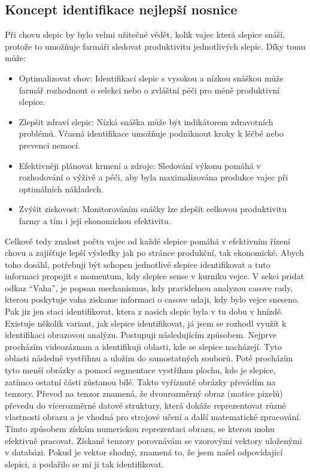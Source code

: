 
\subsection{Koncept identifikace nejlepší nosnice}\label{subsec:koncept-identifikace-nejlepsi-nosnice}

Při chovu slepic by bylo velmi užitečné vědět, kolik vajec která slepice snáší, protože to umožňuje farmáři sledovat produktivitu jednotlivých slepic.
Díky tomu může:
\begin{itemize}
    \item Optimalizovat chov: Identifikací slepic s vysokou a nízkou snáškou může farmář rozhodnout o selekci nebo o zvláštní péči pro méně produktivní slepice.
    \item Zlepšit zdraví slepic: Nízká snáška může být indikátorem zdravotních problémů. Včasná identifikace umožňuje podniknout kroky k léčbě nebo prevenci nemocí.
    \item Efektivněji plánovat krmení a zdroje: Sledování výkonu pomáhá v rozhodování o výživě a péči, aby byla maximalizována produkce vajec při optimálních nákladech.
    \item Zvýšit ziskovost: Monitorováním snášky lze zlepšit celkovou produktivitu farmy a tím i její ekonomickou efektivitu.
\end{itemize}

Celkově tedy znalost počtu vajec od každé slepice pomáhá v efektivním řízení chovu a zajišťuje lepší výsledky jak po stránce produkční, tak ekonomické.
Abych toho dosáhl, potřebuji být schopen jednotlivé slepice identifikovat a tuto informaci propojit s momentum, kdy slepice sense v kurniku vejce.
V sekci  pridat odkaz  “Vaha”, je popsan mechanismus, kdy pravidelnou analyzou casove rady, kterou poskytuje vaha ziskame informaci o casove udaji, kdy bylo vejce sneseno.
Pak jiz jen staci identifikovat, ktera z nasich slepic byla v tu dobu v hnízdě.
Existuje několik variant, jak slepice identifikovat, já jsem se rozhodl využít k identifikaci obrazovou analýzu.
Postupuji následujícím způsobem.
Nejprve procházím videozáznam a identifikuji oblasti, kde se slepice nacházejí.
Tyto oblasti následně vystřihnu a uložím do samostatných souborů.
Poté procházím tyto menší obrázky a pomocí segmentace vystřihnu plochu, kde je slepice, zatímco ostatní části zůstanou bílé.
Takto vyříznuté obrázky převádím na tenzory.
Převod na tenzor znamená, že dvourozměrný obraz (matice pixelů) převedu do vícerozměrné datové struktury, která dokáže reprezentovat různé vlastnosti obrazu a je vhodná pro strojové učení a další matematické zpracování.
Tímto způsobem získám numerickou reprezentaci obrazu, se kterou mohu efektivně pracovat.
Získané tenzory porovnávám se vzorovými vektory uloženými v databázi.
Pokud je vektor shodný, znamená to, že jsem našel odpovídající slepici, a podařilo se mi ji tak identifikovat.


